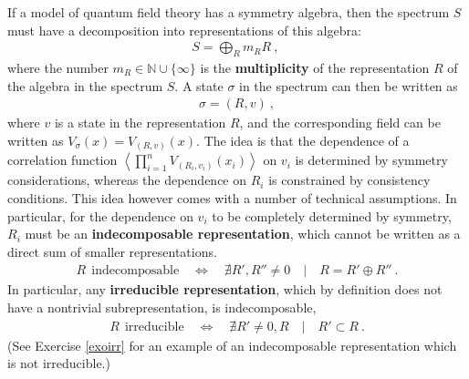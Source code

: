 \documentclass[12pt,a4paper,notitlepage]{report}
\newcommand \la {\left\langle}
\newcommand \ra {\right\rangle}
\newcommand \N {\mathbb{N}}
\numberwithin{equation}{section}
\theoremstyle{break}
\begin{document}
If a model of quantum field theory has a symmetry algebra, then the spectrum $S$ must have a decomposition into representations of this algebra:
\begin{align}
 S = \bigoplus_R m_R  R\ ,\
\label{somr}
\end{align}
where the number $m_R \in \N\cup\{\infty\}$ is the \textbf{\boldmath multiplicity} of the representation $R$ of the algebra in the spectrum $S$. A state $\sigma$ in the spectrum can then be written as 
\begin{align}
 \sigma = (R,v)\ ,
\label{arv}
\end{align}
where $v$ is a state in the representation $R$, and the corresponding field can be written as 
$V_\sigma(x)= V_{(R,v)}(x)$.
The idea is that the dependence of a correlation function $\la \prod_{i=1}^n V_{(R_i,v_i)}(x_i)\ra$ on $v_i$ is determined by symmetry considerations, whereas the dependence on $R_i$ is constrained by consistency conditions. This idea however comes with a number of technical assumptions. In particular, for the dependence on $v_i$ to be completely determined by symmetry, $R_i$ must be an \textbf{\boldmath indecomposable representation}, which cannot be written as a direct sum of smaller representations.
\begin{align}
 R \ \ \text{indecomposable} \quad \Leftrightarrow \quad \nexists R',R'' \neq 0 \quad | \quad R = R'\oplus R''\ .
\end{align}
In particular, any \textbf{\boldmath irreducible representation}, which by definition does not have a nontrivial subrepresentation, is indecomposable,
\begin{align}
 R \ \ \text{irreducible} \quad \Leftrightarrow \quad \nexists R' \neq 0,R \quad | \quad R'\subset R\ .
\end{align}
(See Exercise \ref{exoirr} for an example of an indecomposable representation which is not irreducible.)
\end{document}

